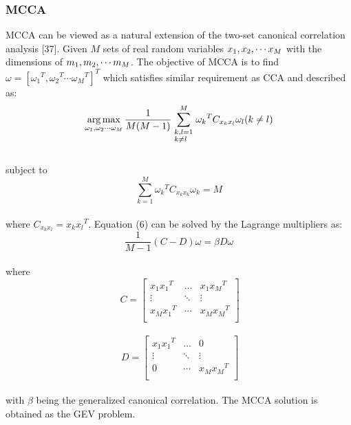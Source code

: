 \documentclass[journal]{IEEEtran}
\begin{document}
\subsubsection{MCCA}
  MCCA can be viewed as a natural extension of the two-set canonical correlation analysis [37]. Given $ M $ sets of real random variables ${x_1},{\rm{ }}{x_2}, \cdots {x_M}$ with the dimensions of ${m_1},{\rm{ }}{m_2}, \cdots {m_M}$. The objective of MCCA is to find $\omega  = {[{\omega _1}^T,{\omega _2}^T \cdots {\omega _M}^T]^T}$ which satisfies similar requirement as CCA and described as: \\
 \begin{equation} \mathop {\arg \max }\limits_{{\omega _1},{\omega _2} \cdots {\omega _M}}  \frac{1}{{M(M - 1)}}\sum\limits_{\scriptstyle k,l = 1 \hfill \atop
  \scriptstyle {\rm{ }}k \ne l \hfill}^M {{\omega _k}^T{C_{{x_k}{x_l}}}{\omega _l}} {\rm{  (}}k \ne l{\rm{)}} \end{equation}\\
  subject to \begin{equation} \sum\limits_{k = 1}^M {{\omega _k}^T{C_{{x_k}{x_k}}}{\omega _k}}  = M \end{equation}\\
  where ${C_{{x_k}{x_l}}} = {x_k}{x_l}^T$. Equation (6) can be solved by the Lagrange multipliers as: \\
  \begin{equation} \frac{1}{{M - 1}}(C - D)\omega  = \beta D\omega \end{equation} \\ where \\
\begin{equation}\ C = \left[ {\begin{array}{*{20}{c}}
   {{x_1}{x_1}^T} &  \ldots  & {{x_1}{x_M}^T}  \\
    \vdots  &  \ddots  &  \vdots   \\
   {{x_M}{x_1}^T} &  \cdots  & {{x_M}{x_M}^T}  \\
\end{array}} \right]
 \end{equation} \\
 \begin{equation}\ D = \left[ {\begin{array}{*{20}{c}}
   {{x_1}{x_1}^T} &  \ldots  & 0  \\
    \vdots  &  \ddots  &  \vdots   \\
   0 &  \cdots  & {{x_M}{x_M}^T}  \\
\end{array}} \right]
\end{equation} \\with $ \beta $ being the generalized canonical correlation. The MCCA solution is obtained as the GEV problem.
\end{document}
